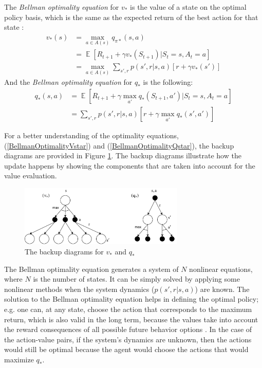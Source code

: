 The \textit{Bellman optimality equation} for $v_{*}$ is the value of a state on the optimal policy basis, which is the same as the expected return of the best action for that state \cite{Sutton}:
\begin{equation}\label{BellmanOptimalityVstar}
\begin{split}
v_{*}(s)&=\max_{a \in A(s)}q_{\pi*}(s,a) \\
&=\mathop{{}\mathbb{E}}\left [ R_{t+1} + \gamma v_{*}(S_{t+1})|S_{t}=s, A_{t}=a  \right ] \\
&=\max_{a \in A(s)}\sum_{s',r}p(s',r|s,a)\left [ r+\gamma v_{*}(s') \right ]
\end{split}
\end{equation}
And the \textit{Bellman optimality equation} for $q_{*}$ is the following:
\begin{equation}\label{BellmanOptimalityQstar}
\begin{split}
q_{*}(s,a)&=\mathop{{}\mathbb{E}}\left [ R_{t+1} + \gamma \max_{a'}q_{*}(S_{t+1},a')|S_{t}=s, A_{t}=a  \right ] \\
&=\sum_{s',r}p(s',r|s,a)\left [ r+\gamma\max_{a'}q_{*}(s',a') \right ]
\end{split}
\end{equation}

For a better understanding of the optimality equations, (\ref{BellmanOptimalityVstar}) and (\ref{BellmanOptimalityQstar}), the backup diagrams are provided in Figure \ref{fig:BellmanBackUp}. The backup diagrams illustrate how the update happens by showing the components that are taken into account for the value evaluation.
\begin{figure}[H]
	\centering
	\includegraphics[width=0.7\textwidth]{Figures/VstarQstarBackupDiagrams}
	\caption{The backup diagrams for $v_{*}$ and $q_{*}$}
	\label{fig:BellmanBackUp}
\end{figure}

The Bellman optimality equation generates a system of $N$ nonlinear equations, where $N$ is the number of states. It can be simply solved by applying some nonlinear methods when the system dynamics ($p(s',r|s,a)$) are known. The solution to the Bellman optimality equation helps in defining the optimal policy; e.g. one can, at any state, choose the action that corresponds to the maximum return, which is also valid in the long term, because the values take into account the reward consequences of all possible future behavior options \cite{Sutton}. In the case of the action-value pairs, if the system's dynamics are unknown, then the actions would still be optimal because the agent would choose the actions that would maximize $q_{*}$.